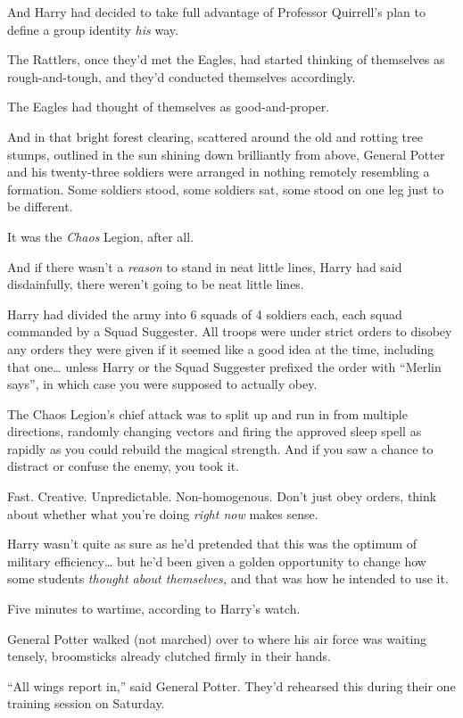 And Harry had decided to take full advantage of Professor Quirrell's
plan to define a group identity \emph{his} way.

The Rattlers, once they'd met the Eagles, had started thinking of
themselves as rough-and-tough, and they'd conducted themselves
accordingly.

The Eagles had thought of themselves as good-and-proper.

And in that bright forest clearing, scattered around the old and rotting
tree stumps, outlined in the sun shining down brilliantly from above,
General Potter and his twenty-three soldiers were arranged in nothing
remotely resembling a formation. Some soldiers stood, some soldiers sat,
some stood on one leg just to be different.

It was the \emph{Chaos} Legion, after all.

And if there wasn't a \emph{reason} to stand in neat little lines, Harry
had said disdainfully, there weren't going to be neat little lines.

Harry had divided the army into 6 squads of 4 soldiers each, each squad
commanded by a Squad Suggester. All troops were under strict orders to
disobey any orders they were given if it seemed like a good idea at the
time, including that one\ldots{} unless Harry or the Squad Suggester
prefixed the order with ``Merlin says'', in which case you were supposed
to actually obey.

The Chaos Legion's chief attack was to split up and run in from multiple
directions, randomly changing vectors and firing the approved sleep
spell as rapidly as you could rebuild the magical strength. And if you
saw a chance to distract or confuse the enemy, you took it.

Fast. Creative. Unpredictable. Non-homogenous. Don't just obey orders,
think about whether what you're doing \emph{right now} makes sense.

Harry wasn't quite as sure as he'd pretended that this was the optimum
of military efficiency\ldots{} but he'd been given a golden opportunity
to change how some students \emph{thought about themselves,} and that
was how he intended to use it.

Five minutes to wartime, according to Harry's watch.

General Potter walked (not marched) over to where his air force was
waiting tensely, broomsticks already clutched firmly in their hands.

``All wings report in,'' said General Potter. They'd rehearsed this
during their one training session on Saturday.

